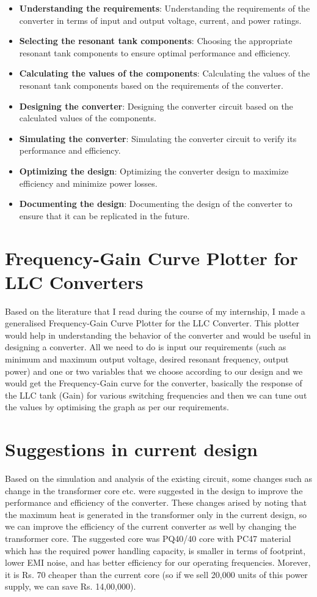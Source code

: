 \begin{itemize}
    \item \textbf{Understanding the requirements}: Understanding the requirements of the converter in terms of input and output voltage, current, and power ratings.
    \item \textbf{Selecting the resonant tank components}: Choosing the appropriate resonant tank components to ensure optimal performance and efficiency.
    \item \textbf{Calculating the values of the components}: Calculating the values of the resonant tank components based on the requirements of the converter.
    \item \textbf{Designing the converter}: Designing the converter circuit based on the calculated values of the components.
    \item \textbf{Simulating the converter}: Simulating the converter circuit to verify its performance and efficiency.
    \item \textbf{Optimizing the design}: Optimizing the converter design to maximize efficiency and minimize power losses.
    \item \textbf{Documenting the design}: Documenting the design of the converter to ensure that it can be replicated in the future.
\end{itemize}

\section{Frequency-Gain Curve Plotter for LLC Converters}
Based on the literature that I read during the course of my internship, I made a generalised Frequency-Gain Curve Plotter for the LLC Converter. This plotter would help in understanding the behavior of the converter and would be useful in designing a converter.
\noindent
All we need to do is input our requirements (such as minimum and maximum output voltage, desired resonant frequency, output power) and one or two variables that we choose according to our design and we would get the Frequency-Gain curve for the converter, basically the response of the LLC tank (Gain) for various switching frequencies and then we can tune out the values by optimising the graph as per our requirements.

\section{Suggestions in current design}
Based on the simulation and analysis of the existing circuit, some changes such as change in the transformer core etc. were suggested in the design to improve the performance and efficiency of the converter. These changes arised by noting that the maximum heat is generated in the transformer only in the current design, so we can improve the efficiency of the current converter as well by changing the transformer core.
The suggested core was PQ40/40 core with PC47 material which has the required power handling capacity, is smaller in terms of footprint, lower EMI noise, and has better efficiency for our operating frequencies. Morever, it is Rs. 70 cheaper than the current core (so if we sell 20,000 units of this power supply, we can save Rs. 14,00,000).

